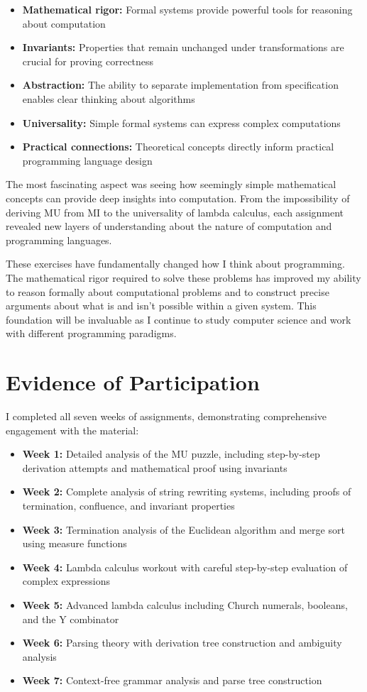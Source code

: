 \documentclass{article}
\theoremstyle{plain}
\theoremstyle{definition}
\theoremstyle{remark}
\begin{document}
\begin{itemize}
\item \textbf{Mathematical rigor:} Formal systems provide powerful tools for reasoning about computation
\item \textbf{Invariants:} Properties that remain unchanged under transformations are crucial for proving correctness
\item \textbf{Abstraction:} The ability to separate implementation from specification enables clear thinking about algorithms
\item \textbf{Universality:} Simple formal systems can express complex computations
\item \textbf{Practical connections:} Theoretical concepts directly inform practical programming language design
\end{itemize}

The most fascinating aspect was seeing how seemingly simple mathematical concepts can provide deep insights into computation. From the impossibility of deriving MU from MI to the universality of lambda calculus, each assignment revealed new layers of understanding about the nature of computation and programming languages.

These exercises have fundamentally changed how I think about programming. The mathematical rigor required to solve these problems has improved my ability to reason formally about computational problems and to construct precise arguments about what is and isn't possible within a given system. This foundation will be invaluable as I continue to study computer science and work with different programming paradigms.

\section{Evidence of Participation}

I completed all seven weeks of assignments, demonstrating comprehensive engagement with the material:

\begin{itemize}
\item \textbf{Week 1:} Detailed analysis of the MU puzzle, including step-by-step derivation attempts and mathematical proof using invariants
\item \textbf{Week 2:} Complete analysis of string rewriting systems, including proofs of termination, confluence, and invariant properties
\item \textbf{Week 3:} Termination analysis of the Euclidean algorithm and merge sort using measure functions
\item \textbf{Week 4:} Lambda calculus workout with careful step-by-step evaluation of complex expressions
\item \textbf{Week 5:} Advanced lambda calculus including Church numerals, booleans, and the Y combinator
\item \textbf{Week 6:} Parsing theory with derivation tree construction and ambiguity analysis
\item \textbf{Week 7:} Context-free grammar analysis and parse tree construction
\end{itemize}
\end{document}
